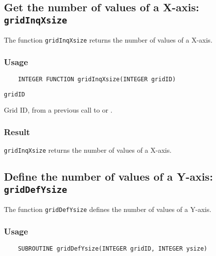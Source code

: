 \subsection{Get the number of values of a X-axis: {\tt gridInqXsize}}
\label{gridInqXsize}

The function {\tt gridInqXsize} returns the number of values of a X-axis.

\subsubsection*{Usage}

\begin{verbatim}
    INTEGER FUNCTION gridInqXsize(INTEGER gridID)
\end{verbatim}

\hspace*{4mm}\begin{minipage}[]{15cm}
\begin{deflist}{\tt gridID\ }
\item[{\tt gridID}]
Grid ID, from a previous call to {} or {}.

\end{deflist}
\end{minipage}

\subsubsection*{Result}

{\tt gridInqXsize} returns the number of values of a X-axis.



\subsection{Define the number of values of a Y-axis: {\tt gridDefYsize}}
\label{gridDefYsize}

The function {\tt gridDefYsize} defines the number of values of a Y-axis.

\subsubsection*{Usage}

\begin{verbatim}
    SUBROUTINE gridDefYsize(INTEGER gridID, INTEGER ysize)
\end{verbatim}

